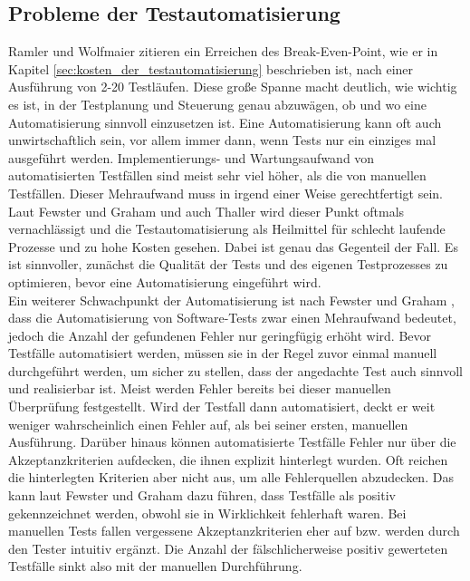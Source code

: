 \subsection{Probleme der Testautomatisierung}
\label{sec:probleme_der_testautomatisierung}
Ramler und Wolfmaier \cite{ramler_economic_2006} zitieren ein Erreichen des Break-Even-Point, wie er in Kapitel \ref{sec:kosten_der_testautomatisierung} beschrieben ist, nach einer Ausführung von 2-20 Testläufen. Diese große Spanne macht deutlich, wie wichtig es ist, in der Testplanung und Steuerung genau abzuwägen, ob und wo eine Automatisierung sinnvoll einzusetzen ist. Eine Automatisierung kann oft auch unwirtschaftlich sein, vor allem immer dann, wenn Tests nur ein einziges mal ausgeführt werden. Implementierungs- und Wartungsaufwand von automatisierten Testfällen sind meist sehr viel höher, als die von manuellen Testfällen. Dieser Mehraufwand muss in irgend einer Weise gerechtfertigt sein. Laut Fewster und Graham \cite[vgl. S. 22 ff.]{fewster_software_1999} und auch Thaller \cite[vgl. S.230 ff.]{thaller_software-test_2002} wird dieser Punkt oftmals vernachlässigt und die Testautomatisierung als Heilmittel für schlecht laufende Prozesse und zu hohe Kosten gesehen. Dabei ist genau das Gegenteil der Fall. Es ist sinnvoller, zunächst die Qualität der Tests und des eigenen Testprozesses zu optimieren, bevor eine Automatisierung eingeführt wird.\\ 
Ein weiterer Schwachpunkt der Automatisierung ist nach Fewster und Graham \cite[vgl. S. 22 ff.]{fewster_software_1999}, dass die Automatisierung von Software-Tests zwar einen Mehraufwand bedeutet, jedoch die Anzahl der gefundenen Fehler nur geringfügig erhöht wird.
Bevor Testfälle automatisiert werden, müssen sie in der Regel zuvor einmal manuell durchgeführt werden, um sicher zu stellen, dass der angedachte Test auch sinnvoll und realisierbar ist. Meist werden Fehler bereits bei dieser manuellen Überprüfung festgestellt. Wird der Testfall dann automatisiert, deckt er weit weniger wahrscheinlich einen Fehler auf, als bei seiner ersten, manuellen Ausführung. Darüber hinaus können automatisierte Testfälle Fehler nur über die Akzeptanzkriterien aufdecken, die ihnen explizit hinterlegt wurden. Oft reichen die hinterlegten Kriterien aber nicht aus, um alle Fehlerquellen abzudecken. Das kann laut Fewster und Graham \cite[vgl. S. 23 ff.]{fewster_software_1999} dazu führen, dass Testfälle als positiv gekennzeichnet werden, obwohl sie in Wirklichkeit fehlerhaft waren. Bei manuellen Tests fallen vergessene Akzeptanzkriterien eher auf bzw. werden durch den Tester intuitiv ergänzt. Die Anzahl der fälschlicherweise positiv gewerteten Testfälle sinkt also mit der manuellen Durchführung.\\
